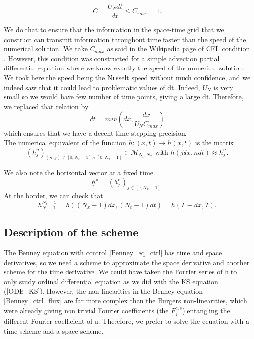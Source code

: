 \documentclass[12pt]{article}
\begin{document}
\begin{equation}\label{CFL_conditions}
    C=\frac{U_N dt}{dx}\leq C_{max}=1.
\end{equation}

We do that to ensure that the information in the space-time grid that we construct can transmit information throughout time faster than the speed of the numerical solution. We take $C_{max}$ as said in the \href{https://en.wikipedia.org/wiki/Courant%E2%80%93Friedrichs%E2%80%93Lewy_condition}{Wikipedia page of CFL condition }. However, this condition was constructed for a simple advection partial differential equation where we know exactly the speed of the numerical solution. We took here the speed being the Nusselt speed without much confidence, and we indeed saw that it could lead to problematic values of dt. Indeed, $U_N$ is very small so we would have few number of time points, giving a large dt. Therefore, we replaced that relation by
\begin{equation}\label{time_step}
dt=min(dx, \frac{dx}{U_N C_{max}})
\end{equation}
which ensures that we have a decent time stepping precision.
\\

The numerical equivalent of the function $h:(x,t)\rightarrow h(x,t)$ is the matrix 
\begin{equation}
(h_j^n)_{(n, j)\in [0,N_t-1]\times[0, N_x-1]} \in \mathcal{M}_{N_t, N_x}  \text{ with } h(jdx,ndt) \approx h_j^n.
\end{equation}

We also note the horizontal vector at a fixed time $$\underline{h}^n = (h_j^n)_{j\in[0, N_x-1]}.$$
At the border, we can check that $$h_{N_t-1}^{N_x-1}=h((N_x-1)dx,(N_t-1)dt)= h(L-dx, T).$$


\subsection{Description of the scheme}

The Benney equation with control \eqref{Benney_eq_ctrl} has time and space derivatives, so we need a scheme to approximate the space derivative and another scheme for the time derivative. We could have taken the Fourier series of h to only study ordinal differential equation as we did with the KS equation (\eqref{ODE_KS}). However, the non-linearities in the Benney equation \eqref{Benney_ctrl_flux} are far more complex than the Burgers non-linearities, which were already giving non trivial Fourier coefficients (the $F_j^{c,s}$) entangling the different Fourier coefficient of u. Therefore, we prefer to solve the equation with a time scheme and a space scheme. 
\end{document}
